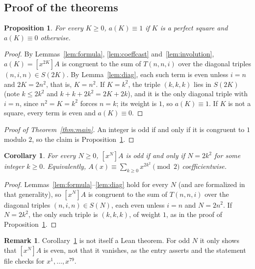 \documentclass[11pt]{amsart}
\theoremstyle{plain}
\newtheorem{proposition}[theorem]{Proposition}
\newtheorem{corollary}[theorem]{Corollary}
\theoremstyle{definition}
\newtheorem{remark}[theorem]{Remark}
\newcommand{\co}[1]{[x^{#1}]}
\begin{document}
\subsection{Proof of the theorems}
\begin{proposition}\label{prop:acast}
For every $K\ge0$, $a(K)\equiv1$ if $K$ is a perfect square and $a(K)\equiv0$ otherwise.
\end{proposition}

\begin{proof}
By Lemmas~\ref{lem:formula}, \ref{lem:coeffcast} and~\ref{lem:involution}, $a(K)=\co{2K}A$ is congruent to the sum of $T(n,n,i)$ over the diagonal triples $(n,i,n)\in S(2K)$. By Lemma~\ref{lem:diag}, each such term is even unless $i=n$ and $2K=2n^2$, that is, $K=n^2$.
If $K=k^2$, the triple $(k,k,k)$ lies in $S(2K)$ (note $k\le 2k^2$ and $k+k+2k^2=2K+2k$), and it is the only diagonal triple with $i=n$, since $n^2=K=k^2$ forces $n=k$; its weight is $1$, so $a(K)\equiv1$. If $K$ is not a square, every term is even and $a(K)\equiv0$.
\end{proof}

\begin{proof}[Proof of Theorem~\ref{thm:main}]
An integer is odd if and only if it is congruent to $1$ modulo $2$, so the claim is Proposition~\ref{prop:acast}.
\end{proof}

\begin{corollary}\label{cor:strong}
For every $N\ge0$, $\co NA$ is odd if and only if $N=2k^2$ for some integer $k\ge0$. Equivalently, $A(x)\equiv\sum_{k\ge0}x^{2k^2}\pmod 2$ coefficientwise.
\end{corollary}

\begin{proof}
Lemmas~\ref{lem:formula}--\ref{lem:diag} hold for every $N$ (and are formalized in that generality), so $\co NA$ is congruent to the sum of $T(n,n,i)$ over the diagonal triples $(n,i,n)\in S(N)$, each even unless $i=n$ and $N=2n^2$. If $N=2k^2$, the only such triple is $(k,k,k)$, of weight $1$, as in the proof of Proposition~\ref{prop:acast}.
\end{proof}

\begin{remark}\label{rem:odd}
Corollary~\ref{cor:strong} is not itself a Lean theorem. For odd $N$ it only shows that $\co NA$ is even, not that it vanishes, as the entry asserts and the statement file checks for $x^1,\dots,x^{79}$.
\end{remark}
\end{document}
